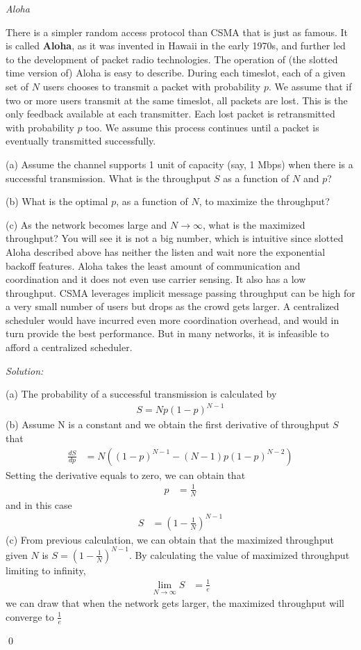 \documentclass[12pt]{article}
\newenvironment{problem}[2][Problem]{\begin{trivlist}
\item[\hskip \labelsep {\bfseries #1}\hskip \labelsep {\bfseries #2.}]}{\end{trivlist}}
\newenvironment{sol}
    {\emph{Solution:}
    }
    {
    \qed
    }
\begin{document}
\begin{problem}{2}
	\textit{Aloha} \par
	There is a simpler random access protocol than CSMA that is just as famous. It is called \textbf{Aloha}, as it was invented in Hawaii in the early 1970s, and further led to the development of packet radio technologies. The operation of (the slotted time version of) Aloha is easy to describe. During each timeslot, each of a given set of $ N $ users chooses to transmit a packet with probability $ p $. We assume that if two or more users transmit at the same timeslot, all packets are lost. This is the only feedback available at each transmitter. Each lost packet is retransmitted with probability $ p $ too. We assume this process continues until a packet is eventually transmitted successfully. \par 
	(a) Assume the channel supports 1 unit of capacity (say, 1 Mbps) when there is a successful transmission. What is the throughput $ S $ as a function of $ N $ and $ p $? \par 
	(b) What is the optimal $ p $, as a function of $ N $, to maximize the throughput? \par
	(c) As the network becomes large and $ N\rightarrow\infty $, what is the maximized throughput? You will see it is not a big number, which is intuitive since slotted Aloha described above has neither the listen and wait nore the exponential backoff features. Aloha takes the least amount of communication and coordination and it does not even use carrier sensing. It also has a low throughput. CSMA leverages implicit message passing throughput can be high for a very small number of users but drops as the crowd gets larger. A centralized scheduler would have incurred even more coordination overhead, and would in turn provide the best performance. But in many networks, it is infeasible to afford a centralized scheduler.
\end{problem}
\begin{sol}
	(a) The probability of a successful transmission is calculated by 
	\begin{align*}
		S = Np(1-p)^{N-1}
	\end{align*}
	(b) Assume N is a constant and we obtain the first derivative of throughput $S$ that
	\begin{align*}
		\frac{dS}{dp} &= N((1-p)^{N-1} - (N-1)p(1-p)^{N-2})
	\end{align*}
	Setting the derivative equals to zero, we can obtain that 
	\begin{align*}
		p &= \frac{1}{N}
	\end{align*}
	and in this case 
	\begin{align*}
		S &= (1-\frac{1}{N}) ^ {N-1}
	\end{align*}
	(c) From previous calculation, we can obtain that the maximized throughput given $ N $ is $S = (1-\frac{1}{N}) ^{N-1}$. By calculating the value of maximized throughput limiting to infinity,
	\begin{align*}
		\lim_{N\rightarrow\infty} S &= \frac{1}{e}
	\end{align*}
	we can draw that when the network gets larger, the maximized throughput will converge to $\frac{1}{e}$
\end{sol}
\end{document}
